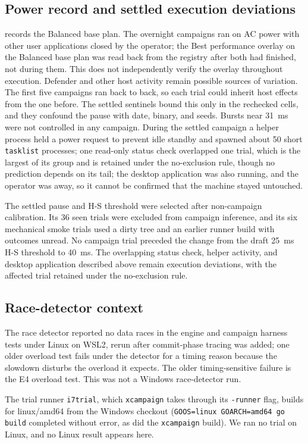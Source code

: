 \subsection{Power record and settled execution deviations}
 records the Balanced base plan. The overnight campaigns ran on AC power with other user applications closed by the operator; the Best performance overlay on the Balanced base plan was read back from the registry after both had finished, not during them. This does not independently verify the overlay throughout execution. Defender and other host activity remain possible sources of variation. The first five campaigns ran back to back, so each trial could inherit host effects from the one before. The settled sentinels bound this only in the rechecked cells, and they confound the pause with date, binary, and seeds. Bursts near 31~ms were not controlled in any campaign. During the settled campaign a helper process held a power request to prevent idle standby and spawned about 50 short \texttt{tasklist} processes; one read-only status check overlapped one trial, which is the largest of its group and is retained under the no-exclusion rule, though no prediction depends on its tail; the desktop application was also running, and the operator was away, so it cannot be confirmed that the machine stayed untouched.

The settled pause and H-S threshold were selected after non-campaign calibration. Its 36 seen trials were excluded from campaign inference, and its six mechanical smoke trials used a dirty tree and an earlier runner build with outcomes unread. No campaign trial preceded the change from the draft 25~ms H-S threshold to 40~ms. The overlapping status check, helper activity, and desktop application described above remain execution deviations, with the affected trial retained under the no-exclusion rule.

\subsection{Race-detector context}
The race detector reported no data races in the engine and campaign harness tests under Linux on WSL2, rerun after commit-phase tracing was added; one older overload test fails under the detector for a timing reason because the slowdown disturbs the overload it expects. The older timing-sensitive failure is the E4 overload test. This was not a Windows race-detector run.

The trial runner \texttt{i7trial}, which \texttt{xcampaign} takes through its \texttt{-runner} flag, builds for linux/amd64 from the Windows checkout (\texttt{GOOS=linux GOARCH=amd64 go build} completed without error, as did the \texttt{xcampaign} build). We ran no trial on Linux, and no Linux result appears here.
